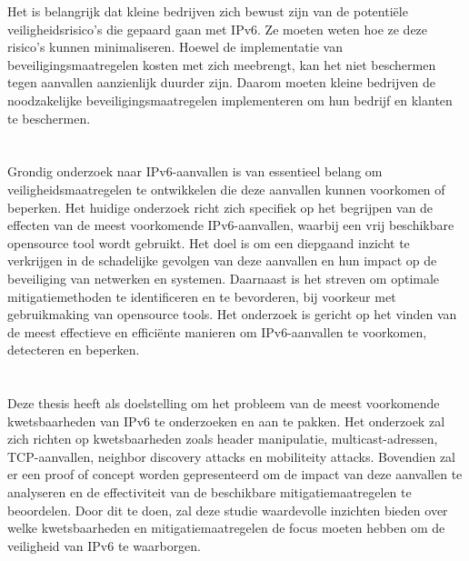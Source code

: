 Het is belangrijk dat kleine bedrijven zich bewust zijn van de potentiële veiligheidsrisico's die gepaard gaan met IPv6. Ze moeten weten hoe ze deze risico's kunnen minimaliseren. Hoewel de implementatie van beveiligingsmaatregelen kosten met zich meebrengt, kan het niet beschermen tegen aanvallen aanzienlijk duurder zijn. Daarom moeten kleine bedrijven de noodzakelijke beveiligingsmaatregelen implementeren om hun bedrijf en klanten te beschermen.

\section{}%
\label{sec:onderzoeksvraag}



Grondig onderzoek naar IPv6-aanvallen is van essentieel belang om veiligheidsmaatregelen te ontwikkelen die deze aanvallen kunnen voorkomen of beperken. Het huidige onderzoek richt zich specifiek op het begrijpen van de effecten van de meest voorkomende IPv6-aanvallen, waarbij een vrij beschikbare opensource tool wordt gebruikt. Het doel is om een diepgaand inzicht te verkrijgen in de schadelijke gevolgen van deze aanvallen en hun impact op de beveiliging van netwerken en systemen. Daarnaast is het streven om optimale mitigatiemethoden te identificeren en te bevorderen, bij voorkeur met gebruikmaking van opensource tools. Het onderzoek is gericht op het vinden van de meest effectieve en efficiënte manieren om IPv6-aanvallen te voorkomen, detecteren en beperken. 

\section{}%
\label{sec:onderzoeksdoelstelling}

Deze thesis heeft als doelstelling om het probleem van de meest voorkomende kwetsbaarheden van IPv6 te onderzoeken en aan te pakken. Het onderzoek zal zich richten op kwetsbaarheden zoals header manipulatie, multicast-adressen, \newline TCP-aanvallen, neighbor discovery attacks en mobiliteity attacks. Bovendien zal er een proof of concept worden gepresenteerd om de impact van deze aanvallen te analyseren en de effectiviteit van de beschikbare mitigatiemaatregelen te beoordelen. Door dit te doen, zal deze studie waardevolle inzichten bieden over welke kwetsbaarheden en mitigatiemaatregelen de focus moeten hebben om de veiligheid van IPv6 te waarborgen.

